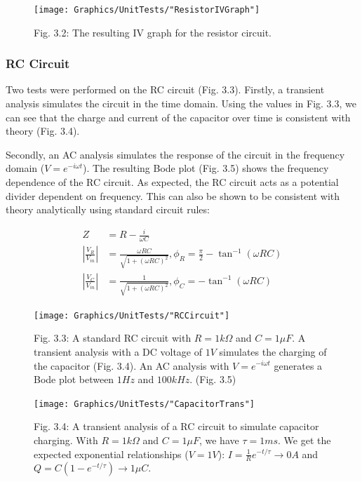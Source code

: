\begin{figure}[h]
  \texttt{[image: Graphics/UnitTests/"ResistorIVGraph"]}
  {\caption*{Fig. 3.2: The resulting IV graph for the resistor circuit.}}
\end{figure}

\subsubsection{RC Circuit}

Two tests were performed on the RC circuit (Fig. 3.3). Firstly, a transient analysis simulates the circuit in the time domain. Using the values in Fig. 3.3, we can see that the charge and current of the capacitor over time is consistent with theory (Fig. 3.4).

Secondly, an AC analysis simulates the response of the circuit in the frequency domain ($V=e^{-i\omega t}$). The resulting Bode plot (Fig. 3.5) shows the frequency dependence of the RC circuit. As expected, the RC circuit acts as a potential divider dependent on frequency. This can also be shown to be consistent with theory analytically using standard circuit rules:

\begin{align*}
  Z &= R-\frac{i}{\omega C} \\
  \left|\frac{V_R}{V_{in}}\right| &= \frac{\omega RC}{\sqrt{1+(\omega RC)^2}}, \phi_R=\frac{\pi}{2}-\tan^{-1}(\omega RC) \\
  \left|\frac{V_C}{V_{in}}\right| &= \frac{1}{\sqrt{1+(\omega RC)^2}}, \phi_C=-\tan^{-1}(\omega RC)
\end{align*}

\begin{figure}[h]
  \centering
  \texttt{[image: Graphics/UnitTests/"RCCircuit"]}
  {\caption*{Fig. 3.3: A standard RC circuit with $R=1k\Omega$ and $C=1\mu F$. A transient analysis with a DC voltage of $1V$ simulates the charging of the capacitor (Fig. 3.4). An AC analysis with $V=e^{-i\omega t}$ generates a Bode plot between $1Hz$ and $100kHz$. (Fig. 3.5)}}
\end{figure}

\begin{figure}[h]
  \texttt{[image: Graphics/UnitTests/"CapacitorTrans"]}
  {\caption*{Fig. 3.4: A transient analysis of a RC circuit to simulate capacitor charging. With $R=1k\Omega$ and $C=1\mu F$, we have $\tau=1ms$. We get the expected exponential relationships ($V=1V$): $I=\frac{1}{R}e^{-t/\tau}\to 0A$ and $Q=C(1-e^{-t/\tau})\to 1\mu C$.}}
\end{figure}

